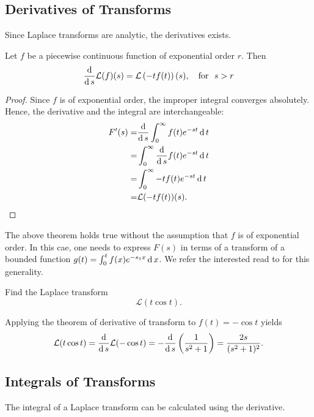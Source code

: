 \subsection*{Derivatives of Transforms}

Since Laplace transforms are analytic, the derivatives exists.

\begin{theorem}
  Let $f$ be a piecewise continuous function of exponential order $r$. Then
  \[\frac{\operatorname{d} }{\operatorname{d} s}\mathcal{L}(f)(s)=\mathcal{L}\left(-tf(t)\right)(s), \quad\text{for }~ s>r\]
\end{theorem}
\begin{proof}
  Since $f$ is of exponential order, the improper integral converges absolutely. Hence, the derivative and the integral are interchangeable:
  \[
  \begin{aligned}
    F'(s)=&\frac{\operatorname{d} }{\operatorname{d} s}\int_0^\infty f(t)e^{-st}\operatorname{d} t\\
    =&\int_0^\infty \frac{\operatorname{d} }{\operatorname{d} s} f(t)e^{-st}\operatorname{d} t\\
    =&\int_0^\infty -tf(t)e^{-st}\operatorname{d} t\\
    =&\mathcal{L}(-tf(t))(s).
  \end{aligned}  
  \]
\end{proof}

The above theorem holds true without the assumption that $f$ is of exponential order. In this cae, one needs to express $F(s)$ in terms of a transform of a bounded function $g(t)=\int_0^t f(x)e^{-s_1x}\operatorname{d} x$. We refer the interested read to \autocite[Chapter 6]{Doetsch1974} for this generality.

\begin{example}
  Find the Laplace transform 
  \[\mathcal{L}(t\cos t).\]
\end{example}
\begin{solution}
  Applying the theorem of derivative of transform to $f(t)=-\cos t$ yields
  \[\mathcal{L}(t\cos t)=\frac{\operatorname{d} }{\operatorname{d} s}\mathcal{L}(-\cos t)=-\frac{\operatorname{d} }{\operatorname{d} s}\left(\frac{1}{s^2+1}\right)=\frac{2s}{(s^2+1)^2}.\]
\end{solution}

\subsection*{Integrals of Transforms}

The integral of a Laplace transform can be calculated using the derivative.

